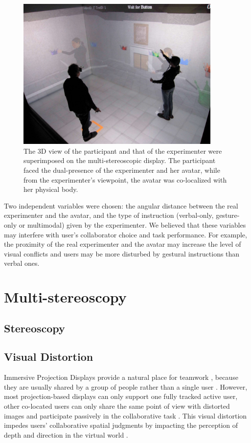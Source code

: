 \begin{figure}[tb]
  \centering
  \includegraphics[width=0.9\textwidth]{figures/2_demo}
  \caption{\label{fig:2_demo}The 3D view of the participant and that of the experimenter were superimposed on the multi-stereoscopic display. The participant faced the dual-presence of the experimenter and her avatar, while from the experimenter's viewpoint, the avatar was co-localized with her physical body.}
\end{figure}

Two independent variables were chosen: the angular distance between the real experimenter and the avatar, and the type of instruction (verbal-only, gesture-only or multimodal) given by the experimenter. We believed that these variables may interfere with user's collaborator choice and task performance. For example, the proximity of the real experimenter and the avatar may increase the level of visual conflicts and users may be more disturbed by gestural instructions than verbal ones.

\section{Multi-stereoscopy}
\subsection{Stereoscopy}
\subsection{Visual Distortion}
Immersive Projection Displays provide a natural place for teamwork \citep{Johanson2002IWP}, because they are usually shared by a group of people rather than a single user \citep{Benford1996SST}. However, most projection-based displays can only support one fully tracked active user, other co-located users can only share the same point of view with distorted images and participate passively in the collaborative task \citep{Bayon2006Multiple}. This visual distortion impedes users' collaborative spatial judgments by impacting the perception of depth and direction in the virtual world \citep{Pollock2012Right}.

